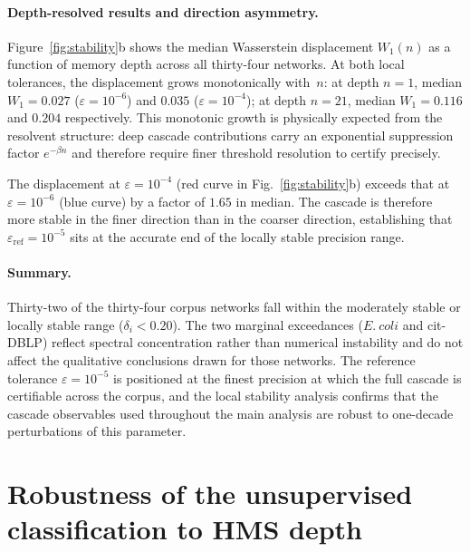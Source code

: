 \documentclass[aps,superscriptaddress,11pt]{revtex4-2}
\theoremstyle{definition}
\theoremstyle{plain}
\begin{document}
\paragraph{Depth-resolved results and direction asymmetry.}
Figure~\ref{fig:stability}b shows the median Wasserstein displacement
$W_1(n)$ as a function of memory depth across all thirty-four networks.
At both local tolerances, the displacement grows monotonically with~$n$:
at depth $n=1$, median $W_1 = 0.027$ ($\varepsilon = 10^{-6}$) and
$0.035$ ($\varepsilon = 10^{-4}$); at depth $n=21$, median $W_1 = 0.116$
and $0.204$ respectively.  This monotonic growth is physically expected
from the resolvent structure: deep cascade contributions carry
an exponential suppression factor $e^{-\beta n}$ and therefore require
finer threshold resolution to certify precisely.

The displacement at $\varepsilon = 10^{-4}$ (red curve in
Fig.~\ref{fig:stability}b) exceeds that at $\varepsilon = 10^{-6}$ (blue
curve) by a factor of $1.65$ in median.  The cascade is therefore more
stable in the finer direction than in the coarser direction, establishing
that $\varepsilon_{\mathrm{ref}} = 10^{-5}$ sits at the accurate end of
the locally stable precision range.

\paragraph{Summary.}
Thirty-two of the thirty-four corpus networks fall within the moderately
stable or locally stable range ($\delta_i < 0.20$).  The two marginal
exceedances ($E.~coli$ and cit-DBLP) reflect spectral concentration rather
than numerical instability and do not affect the qualitative conclusions
drawn for those networks.  The reference tolerance $\varepsilon = 10^{-5}$
is positioned at the finest precision at which the full cascade is
certifiable across the corpus, and the local stability analysis confirms
that the cascade observables used throughout the main analysis are robust
to one-decade perturbations of this parameter.



\section{Robustness of the unsupervised classification to HMS depth}
\label{sec:depth_robustness}
\end{document}
